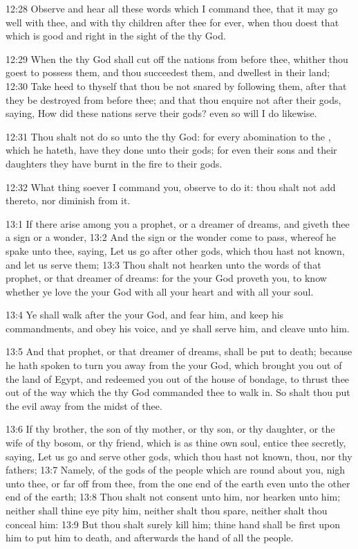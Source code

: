 12:28 Observe and hear all these words which I command thee, that it
may go well with thee, and with thy children after thee for ever, when
thou doest that which is good and right in the sight of the \LORD thy
God.

12:29 When the \LORD thy God shall cut off the nations from before
thee, whither thou goest to possess them, and thou succeedest them,
and dwellest in their land; 12:30 Take heed to thyself that thou be
not snared by following them, after that they be destroyed from before
thee; and that thou enquire not after their gods, saying, How did
these nations serve their gods? even so will I do likewise.

12:31 Thou shalt not do so unto the \LORD thy God: for every
abomination to the \LORD, which he hateth, have they done unto their
gods; for even their sons and their daughters they have burnt in the
fire to their gods.

12:32 What thing soever I command you, observe to do it: thou shalt
not add thereto, nor diminish from it.

13:1 If there arise among you a prophet, or a dreamer of dreams, and
giveth thee a sign or a wonder, 13:2 And the sign or the wonder come
to pass, whereof he spake unto thee, saying, Let us go after other
gods, which thou hast not known, and let us serve them; 13:3 Thou
shalt not hearken unto the words of that prophet, or that dreamer of
dreams: for the \LORD your God proveth you, to know whether ye love the
\LORD your God with all your heart and with all your soul.

13:4 Ye shall walk after the \LORD your God, and fear him, and keep his
commandments, and obey his voice, and ye shall serve him, and cleave
unto him.

13:5 And that prophet, or that dreamer of dreams, shall be put to
death; because he hath spoken to turn you away from the \LORD your God,
which brought you out of the land of Egypt, and redeemed you out of
the house of bondage, to thrust thee out of the way which the \LORD thy
God commanded thee to walk in. So shalt thou put the evil away from
the midst of thee.

13:6 If thy brother, the son of thy mother, or thy son, or thy
daughter, or the wife of thy bosom, or thy friend, which is as thine
own soul, entice thee secretly, saying, Let us go and serve other
gods, which thou hast not known, thou, nor thy fathers; 13:7 Namely,
of the gods of the people which are round about you, nigh unto thee,
or far off from thee, from the one end of the earth even unto the
other end of the earth; 13:8 Thou shalt not consent unto him, nor
hearken unto him; neither shall thine eye pity him, neither shalt thou
spare, neither shalt thou conceal him: 13:9 But thou shalt surely kill
him; thine hand shall be first upon him to put him to death, and
afterwards the hand of all the people.

